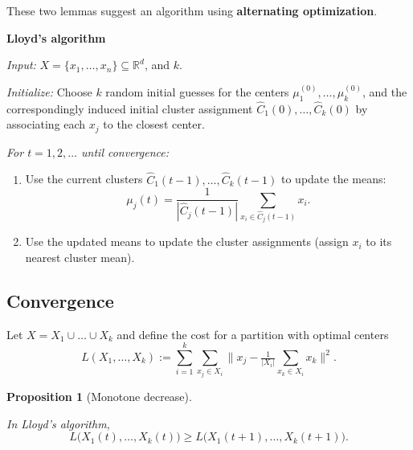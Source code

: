\documentclass[
  letterpaper,
  DIV=11,
  numbers=noendperiod]{scrreprt}
\providecommand{\tightlist}{%
  \setlength{\itemsep}{0pt}\setlength{\parskip}{0pt}}
\theoremstyle{definition}
\theoremstyle{plain}
\theoremstyle{plain}
\newtheorem{proposition}{Proposition}[chapter]
\theoremstyle{definition}
\theoremstyle{plain}
\theoremstyle{plain}
\theoremstyle{remark}
\begin{document}
These two lemmas suggest an algorithm using \textbf{alternating
optimization}.

\begin{tcolorbox}[enhanced jigsaw, leftrule=.75mm, bottomrule=.15mm, left=2mm, colback=white, colframe=quarto-callout-note-color-frame, toprule=.15mm, breakable, arc=.35mm, rightrule=.15mm, opacityback=0]
\begin{minipage}[t]{5.5mm}
\textcolor{quarto-callout-note-color}{\faInfo}
\end{minipage}%
\begin{minipage}[t]{\textwidth - 5.5mm}

\textbf{Lloyd's algorithm}

\emph{Input:} \(X = \{x_1, \dots, x_n\} \subseteq \mathbb{R}^d\), and
\(k\).

\emph{Initialize:} Choose \(k\) random initial guesses for the centers
\(\mu_1^{(0)}, \dots, \mu_k^{(0)}\), and the correspondingly induced
initial cluster assignment \(\hat{C}_1(0), \dots, \hat{C}_k(0)\) by
associating each \(x_j\) to the closest center.

\emph{For \(t = 1, 2, \dots\) until convergence:}

\begin{enumerate}
\def\labelenumi{\arabic{enumi}.}
\tightlist
\item
  Use the current clusters \(\hat{C}_1(t-1), \dots, \hat{C}_k(t-1)\) to
  update the means: \[
  \mu_j(t) = \frac{1}{|\hat{C}_j(t-1)|} \sum_{x_i \in \hat{C}_j(t-1)} x_i .
  \]
\item
  Use the updated means to update the cluster assignments (assign
  \(x_i\) to its nearest cluster mean).
\end{enumerate}

\end{minipage}%
\end{tcolorbox}

\subsection{Convergence}\label{convergence}

Let \(X = X_1 \cup \dots \cup X_k\) and define the cost for a partition
with optimal centers \[
L(X_1, \dots, X_k) := \sum_{i=1}^{k} \sum_{x_j \in X_i} \Big\| x_j - \tfrac{1}{|X_i|} \sum_{x_k \in X_i} x_k \Big\|^2 .
\]

\begin{proposition}[Monotone
decrease]\protect\hypertarget{prp-lloyd-monotone}{}\label{prp-lloyd-monotone}

In Lloyd's algorithm, \[
L\big(X_1(t), \dots, X_k(t)\big) \ge L\big(X_1(t+1), \dots, X_k(t+1)\big).
\]

\end{proposition}
\end{document}
